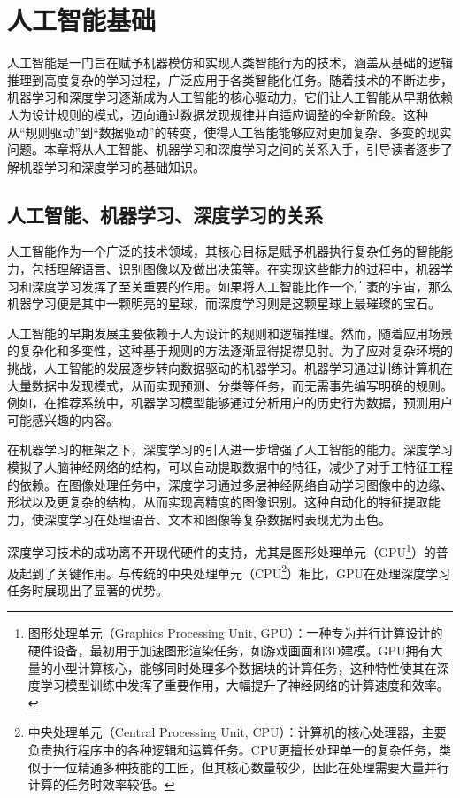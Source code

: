 \chapter{人工智能基础}
人工智能是一门旨在赋予机器模仿和实现人类智能行为的技术，涵盖从基础的逻辑推理到高度复杂的学习过程，广泛应用于各类智能化任务。随着技术的不断进步，机器学习和深度学习逐渐成为人工智能的核心驱动力，它们让人工智能从早期依赖人为设计规则的模式，迈向通过数据发现规律并自适应调整的全新阶段。这种从“规则驱动”到“数据驱动”的转变，使得人工智能能够应对更加复杂、多变的现实问题。本章将从人工智能、机器学习和深度学习之间的关系入手，引导读者逐步了解机器学习和深度学习的基础知识。

\section{人工智能、机器学习、深度学习的关系}

人工智能作为一个广泛的技术领域，其核心目标是赋予机器执行复杂任务的智能能力，包括理解语言、识别图像以及做出决策等。在实现这些能力的过程中，机器学习和深度学习发挥了至关重要的作用。如果将人工智能比作一个广袤的宇宙，那么机器学习便是其中一颗明亮的星球，而深度学习则是这颗星球上最璀璨的宝石。

人工智能的早期发展主要依赖于人为设计的规则和逻辑推理。然而，随着应用场景的复杂化和多变性，这种基于规则的方法逐渐显得捉襟见肘。为了应对复杂环境的挑战，人工智能的发展逐步转向数据驱动的机器学习。机器学习通过训练计算机在大量数据中发现模式，从而实现预测、分类等任务，而无需事先编写明确的规则。例如，在推荐系统中，机器学习模型能够通过分析用户的历史行为数据，预测用户可能感兴趣的内容。

在机器学习的框架之下，深度学习的引入进一步增强了人工智能的能力。深度学习模拟了人脑神经网络的结构，可以自动提取数据中的特征，减少了对手工特征工程的依赖。在图像处理任务中，深度学习通过多层神经网络自动学习图像中的边缘、形状以及更复杂的结构，从而实现高精度的图像识别。这种自动化的特征提取能力，使深度学习在处理语音、文本和图像等复杂数据时表现尤为出色。

深度学习技术的成功离不开现代硬件的支持，尤其是图形处理单元（GPU\footnote{图形处理单元（Graphics Processing Unit, GPU）：一种专为并行计算设计的硬件设备，最初用于加速图形渲染任务，如游戏画面和3D建模。GPU拥有大量的小型计算核心，能够同时处理多个数据块的计算任务，这种特性使其在深度学习模型训练中发挥了重要作用，大幅提升了神经网络的计算速度和效率。}）的普及起到了关键作用。与传统的中央处理单元（CPU\footnote{中央处理单元（Central Processing Unit, CPU）：计算机的核心处理器，主要负责执行程序中的各种逻辑和运算任务。CPU更擅长处理单一的复杂任务，类似于一位精通多种技能的工匠，但其核心数量较少，因此在处理需要大量并行计算的任务时效率较低。}）相比，GPU在处理深度学习任务时展现出了显著的优势。

